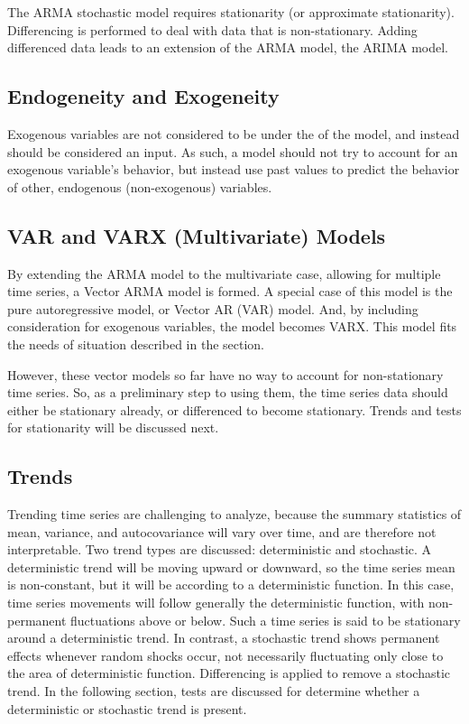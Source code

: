 \documentclass[a4paper]{scrartcl}
\begin{document}
The ARMA stochastic model requires stationarity (or approximate stationarity). Differencing is performed to deal with data that is non-stationary. Adding differenced data leads to an extension of the ARMA model, the ARIMA model.

\subsection*{Endogeneity and Exogeneity}
Exogenous variables are not considered to be under the  of the model, and instead should be considered an input. As such, a model should not try to account for an exogenous variable's behavior, but instead use past values to predict the behavior of other, endogenous (non-exogenous) variables.

\subsection*{VAR and VARX (Multivariate) Models}
By extending the ARMA model to the multivariate case, allowing for multiple time series, a Vector ARMA model is formed. A special case of this model is the pure autoregressive model, or Vector AR (VAR) model. And, by including consideration for exogenous variables, the model becomes VARX. This model fits the needs of situation described in the  section.

However, these vector models so far have no way to account for non-stationary time series. So, as a preliminary step to using them, the time series data should either be stationary already, or differenced to become stationary. Trends and tests for stationarity will be discussed next.

\subsection*{Trends}
Trending time series are challenging to analyze, because the summary statistics of mean, variance, and autocovariance will vary over time, and are therefore not interpretable\cite{franses1998time}. Two trend types are discussed: deterministic and stochastic. A deterministic trend will be moving upward or downward, so the time series mean is non-constant, but it will be according to a deterministic function. In this case, time series movements will follow generally the deterministic function, with non-permanent fluctuations above or below. Such a time series is said to be stationary around a deterministic trend. In contrast, a stochastic trend shows permanent effects whenever random shocks occur, not necessarily fluctuating only close to the area of deterministic function. Differencing is applied to remove a stochastic trend. In the following section, tests are discussed for determine whether a deterministic or stochastic trend is present.
\end{document}
